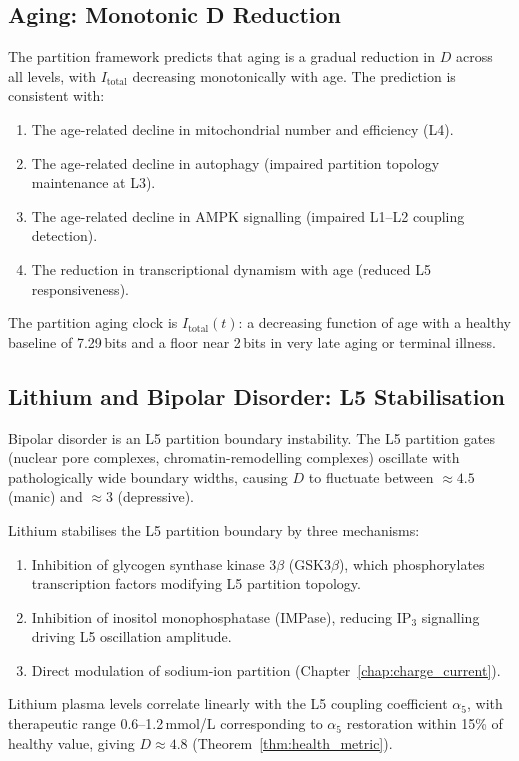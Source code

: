 \subsection{Aging: Monotonic D Reduction}
\label{ssec:aging}

The partition framework predicts that aging is a gradual reduction in $D$
across all levels, with $I_{\mathrm{total}}$ decreasing monotonically with
age. The prediction is consistent with:
\begin{enumerate}
  \item The age-related decline in mitochondrial number and efficiency (L4).
  \item The age-related decline in autophagy (impaired partition topology
        maintenance at L3).
  \item The age-related decline in AMPK signalling (impaired L1--L2 coupling
        detection).
  \item The reduction in transcriptional dynamism with age (reduced L5
        responsiveness).
\end{enumerate}
The partition aging clock is $I_{\mathrm{total}}(t)$: a decreasing function
of age with a healthy baseline of 7.29\,bits and a floor near 2\,bits
in very late aging or terminal illness.

\subsection{Lithium and Bipolar Disorder: L5 Stabilisation}
\label{ssec:lithium}

Bipolar disorder is an L5 partition boundary instability. The L5 partition
gates (nuclear pore complexes, chromatin-remodelling complexes) oscillate
with pathologically wide boundary widths, causing $D$ to fluctuate between
$\approx 4.5$ (manic) and $\approx 3$ (depressive).

Lithium stabilises the L5 partition boundary by three mechanisms:
\begin{enumerate}
  \item Inhibition of glycogen synthase kinase 3$\beta$ (GSK3$\beta$), which
        phosphorylates transcription factors modifying L5 partition topology.
  \item Inhibition of inositol monophosphatase (IMPase), reducing IP$_3$
        signalling driving L5 oscillation amplitude.
  \item Direct modulation of sodium-ion partition (Chapter~\ref{chap:charge_current}).
\end{enumerate}
Lithium plasma levels correlate linearly with the L5 coupling coefficient
$\alpha_5$, with therapeutic range 0.6--1.2\,mmol/L corresponding to
$\alpha_5$ restoration within 15\% of healthy value, giving
$D \approx 4.8$ (Theorem~\ref{thm:health_metric}).

